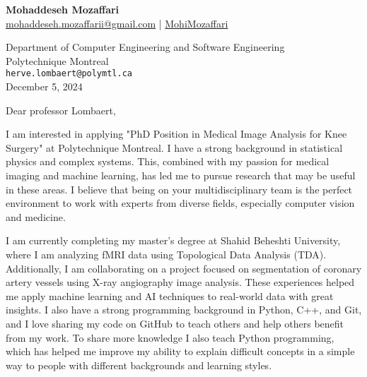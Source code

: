 \documentclass[letterpaper,11pt]{letter}
\begin{document}
\begin{center}
    \textbf{\Huge Mohaddeseh Mozaffari} \\
    \small{\href{mailto:mohaddeseh.mozaffarii@gmail.com}{ mohaddeseh.mozaffarii@gmail.com} | 	\href{https://www.linkedin.com/in/MohiMozaffari/}{ MohiMozaffari}}
\end{center}

\vspace{1em}

\begin{flushleft}
    Department of Computer Engineering and Software Engineering\\
    Polytechnique Montreal\\
    \texttt{herve.lombaert@polymtl.ca} \\
    December 5, 2024
\end{flushleft}

\vspace{1em}

\begin{flushleft}
    Dear professor Lombaert,
\end{flushleft}

\vspace{1em}
I am interested in applying "PhD Position in Medical Image Analysis for Knee Surgery" at Polytechnique Montreal. I have a strong background in statistical physics and complex systems. This, combined with my passion for medical imaging and machine learning, has led me to pursue research that may be useful in these areas. I believe that being on your multidisciplinary team is the perfect environment to work with experts from diverse fields, especially computer vision and medicine.

I am currently completing my master's degree at Shahid Beheshti University, where I am analyzing fMRI data using Topological Data Analysis (TDA). Additionally, I am collaborating on a project focused on segmentation of coronary artery vessels using X-ray angiography image analysis. These experiences helped me apply machine learning and AI techniques to real-world data with great insights. I also have a strong programming background in Python, C++, and Git, and I love sharing my code on GitHub to teach others and help others benefit from my work. To share more knowledge I also teach Python programming, which has helped me improve my ability to explain difficult concepts in a simple way to people with different backgrounds and learning styles.
\end{document}
